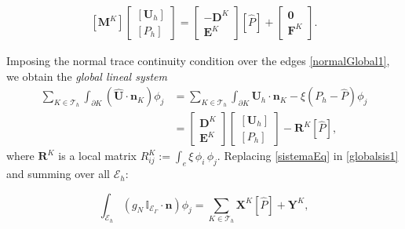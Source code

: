 \documentclass[review]{elsarticle}
\def\trian{\mathcal{T}_h}
\def\nn{\textbf{n}}
\def\unn{\textbf{U}}
\def\esq{\mathcal{E}}
\begin{document}
\begin{equation}\label{sistemaEq}
\begin{aligned}
\left[ \textbf{M}^K  \right] 
\left[\begin{array}{c}
\left[\unn_h\right] \\ 
\left[ P_h \right]
\end{array} \right]  = 
\left[\begin{array}{c}
- \textbf{D}^K  \\ 
\textbf{E}^K 
\end{array} \right] 
[\hat{P}] + 
\left[\begin{array}{c}
\textbf{0}  \\ 
\textbf{F}^K 
\end{array} \right].
\end{aligned}
\end{equation}

Imposing the normal trace continuity condition over the edges \eqref{normalGlobal1}, we obtain the \textit{global lineal system} 
\begin{align}\label{globalsis1}
\sum_{K \in \trian} \int_{\partial K} (\hat{\unn}\cdot \nn_K ) \phi_j   &=  \sum_{K \in \trian}  \int_{\partial K} \unn_h \cdot \nn_K - \xi(P_h-\hat{P})\phi_j  \nonumber  \\
&= \left[\begin{array}{c}
\textbf{D}^K  \\ 
\textbf{E}^K 
\end{array} \right] \left[\begin{array}{c}
\left[\unn_h\right] \\ 
\left[ P_h \right]
\end{array} \right] -  \textbf{R}^K [\hat{P}], 
\end{align}
where $\textbf{R}^K$ is a local matrix $ R_{ij}^K := \int_{e} \xi\,\phi_i\,\phi_j $. Replacing  \eqref{sistemaEq} in \eqref{globalsis1} and summing over all $\esq_h$:

\begin{equation*}
\int_{\esq_h} (g_N\,\mathbb{I}_{\esq_{\Gamma}}\cdot\nn)\phi_j = \sum_{K \in \trian} \textbf{X}^K[\hat{P}] + \textbf{Y}^K,
\end{equation*}
\end{document}
